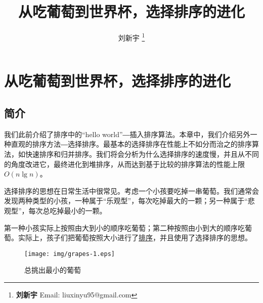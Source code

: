 \documentclass[UTF8]{article}
\begin{document}


\title{从吃葡萄到世界杯，选择排序的进化}

\author{刘新宇
\thanks{{\bfseries 刘新宇 } \newline
  Email: liuxinyu95@gmail.com \newline}
  }

\maketitle
\fi


\ifx\wholebook\relax
\chapter{从吃葡萄到世界杯，选择排序的进化}
\fi

\def\includetikz{}

\section{简介}
\label{introduction} 

我们此前介绍了排序中的“hello world”―插入排序算法。本章中，我们介绍另外一种直观的排序方法―选择排序。最基本的选择排序在性能上不如分而治之的排序算法，如快速排序和归并排序。我们将会分析为什么选择排序的速度慢，并且从不同的角度改进它，最终进化到堆排序，从而达到基于比较的排序算法的性能上限$O(n \lg n)$。

选择排序的思想在日常生活中很常见。考虑一个小孩要吃掉一串葡萄。我们通常会发现两种类型的小孩，一种属于“乐观型”，每次吃掉最大的一颗；另一种属于“悲观型”，每次总吃掉最小的一颗。

第一种小孩实际上按照由大到小的顺序吃葡萄；第二种按照由小到大的顺序吃葡萄。实际上，孩子们把葡萄按照大小进行了\underline{排序}，并且使用了选择排序的思想。
\begin{figure}[htbp]
  \centering
  \texttt{[image: img/grapes-1.eps]}
  \caption{总挑出最小的葡萄}
  \label{fig:eat-grapes}
\end{figure}
\end{document}
